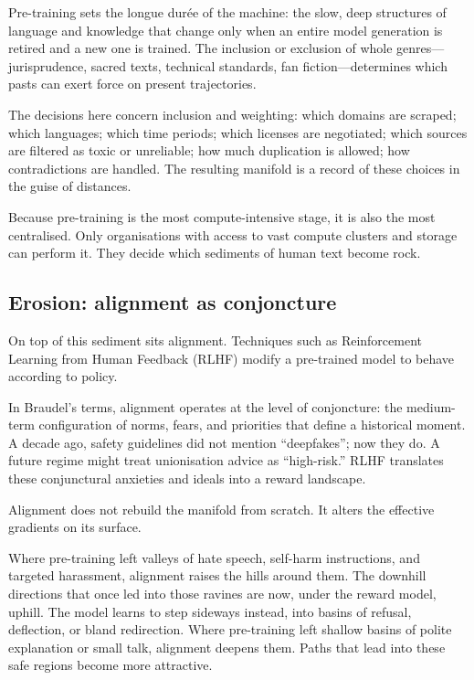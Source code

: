 \documentclass[12pt,a4paper]{article}
\begin{document}
Pre-training sets the longue durée of the machine: the slow, deep structures of language and knowledge that change only when an entire model generation is retired and a new one is trained. The inclusion or exclusion of whole genres---jurisprudence, sacred texts, technical standards, fan fiction---determines which pasts can exert force on present trajectories.

The decisions here concern inclusion and weighting: which domains are scraped; which languages; which time periods; which licenses are negotiated; which sources are filtered as toxic or unreliable; how much duplication is allowed; how contradictions are handled. The resulting manifold is a record of these choices in the guise of distances.

Because pre-training is the most compute-intensive stage, it is also the most centralised. Only organisations with access to vast compute clusters and storage can perform it. They decide which sediments of human text become rock.

\subsection{Erosion: alignment as conjoncture}

On top of this sediment sits alignment. Techniques such as Reinforcement Learning from Human Feedback (RLHF) modify a pre-trained model to behave according to policy.

In Braudel's terms, alignment operates at the level of conjoncture: the medium-term configuration of norms, fears, and priorities that define a historical moment. A decade ago, safety guidelines did not mention ``deepfakes''; now they do. A future regime might treat unionisation advice as ``high-risk.'' RLHF translates these conjunctural anxieties and ideals into a reward landscape.

Alignment does not rebuild the manifold from scratch. It alters the effective gradients on its surface.

Where pre-training left valleys of hate speech, self-harm instructions, and targeted harassment, alignment raises the hills around them. The downhill directions that once led into those ravines are now, under the reward model, uphill. The model learns to step sideways instead, into basins of refusal, deflection, or bland redirection. Where pre-training left shallow basins of polite explanation or small talk, alignment deepens them. Paths that lead into these safe regions become more attractive.
\end{document}
